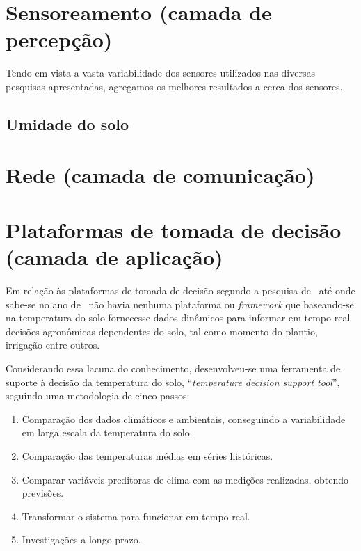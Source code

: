 \documentclass[
article,			%
12pt,				%
oneside,			%
a4paper,			%
english,			%
brazil,				%
sumario=tradicional
]{abntex2}
\begin{document}
\section{Sensoreamento (camada de percepção)}\label{Sensoreamento do solo (camada de percepção)}

Tendo em vista a vasta variabilidade dos sensores utilizados nas diversas pesquisas apresentadas, agregamos os melhores resultados a cerca dos sensores.

\subsection{Umidade do solo}\label{Umidade do solo}

\section{Rede (camada de comunicação)}\label{Rede (camada de comunicação)}

\section{Plataformas de tomada de decisão (camada de aplicação)}\label{Plataformas de tomada de decisão}%
Em relação às plataformas de tomada de decisão segundo a pesquisa de~\citeauthor{1} até onde sabe-se no ano de~\citeyear{1} não havia nenhuma plataforma ou \textit{framework} que baseando-se na temperatura do solo fornecesse dados dinâmicos para informar em tempo real decisões agronômicas dependentes do solo, tal como momento do plantio, irrigação entre outros.

Considerando essa lacuna do conhecimento, desenvolveu-se uma ferramenta de suporte à decisão da temperatura do solo, ``\textit{temperature decision support tool}'', seguindo uma metodologia de cinco passos:
\begin{enumerate}
  \item Comparação dos dados climáticos e ambientais, conseguindo a variabilidade em larga escala da temperatura do solo.

  \item Comparação das temperaturas médias em séries históricas.
  \item Comparar variáveis preditoras de clima com as medições realizadas, obtendo previsões.
  \item Transformar o sistema para funcionar em tempo real.
  \item Investigações a longo prazo.
\end{enumerate}
\end{document}
